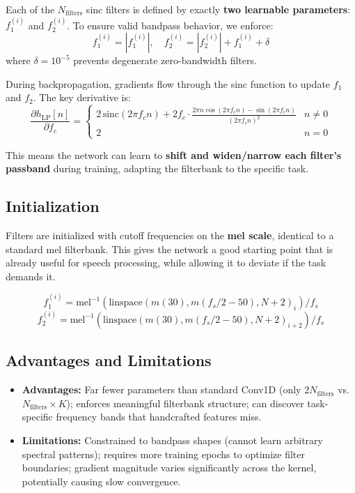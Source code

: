 \documentclass[12pt]{report}
\begin{document}
Each of the $N_\text{filters}$ sinc filters is defined by exactly \textbf{two learnable
parameters}: $f_1^{(i)}$ and $f_2^{(i)}$. To ensure valid bandpass behavior, we enforce:
\begin{equation}
    f_1^{(i)} = |f_1^{(i)}|, \quad f_2^{(i)} = |f_2^{(i)}| + f_1^{(i)} + \delta
\end{equation}
where $\delta = 10^{-5}$ prevents degenerate zero-bandwidth filters.

During backpropagation, gradients flow through the sinc function to update $f_1$ and $f_2$.
The key derivative is:
\begin{equation}
    \frac{\partial h_\text{LP}[n]}{\partial f_c} = \begin{cases}
        2 \,\text{sinc}(2\pi f_c n) + 2f_c \cdot \frac{2\pi n \cos(2\pi f_c n) - \sin(2\pi f_c n)}{(2\pi f_c n)^2} & n \neq 0 \\
        2 & n = 0
    \end{cases}
\end{equation}

This means the network can learn to \textbf{shift and widen/narrow each filter's passband}
during training, adapting the filterbank to the specific task.

\subsection{Initialization}

Filters are initialized with cutoff frequencies on the \textbf{mel scale}, identical to a
standard mel filterbank. This gives the network a good starting point that is already useful
for speech processing, while allowing it to deviate if the task demands it.

\begin{equation}
    f_1^{(i)} = \text{mel}^{-1}\!\left(\text{linspace}(m(30), m(f_s/2 - 50), N+2)_i\right) / f_s
\end{equation}
\begin{equation}
    f_2^{(i)} = \text{mel}^{-1}\!\left(\text{linspace}(m(30), m(f_s/2 - 50), N+2)_{i+2}\right) / f_s
\end{equation}

\subsection{Advantages and Limitations}

\begin{itemize}
    \item \textbf{Advantages:} Far fewer parameters than standard Conv1D (only $2N_\text{filters}$
          vs. $N_\text{filters} \times K$); enforces meaningful filterbank structure; can discover
          task-specific frequency bands that handcrafted features miss.
    \item \textbf{Limitations:} Constrained to bandpass shapes (cannot learn arbitrary spectral
          patterns); requires more training epochs to optimize filter boundaries; gradient
          magnitude varies significantly across the kernel, potentially causing slow convergence.
\end{itemize}
\end{document}
